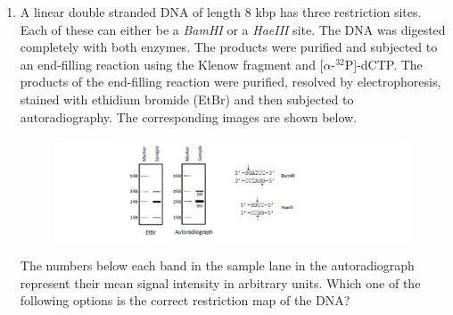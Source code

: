 \documentclass[journal,12pt,onecolumn]{IEEEtran}
\begin{document}
\begin{enumerate}[label=\textbf{Q.\arabic*}]
\begin{multicols}{4}
\begin{enumerate}
\item$0.85$  
\item $0.65$
\item $0.45$  
\item $0.25$  
\end{enumerate}
\end{multicols}\hfill (GATE BT 2015)


\item A linear double stranded DNA of length 8 kbp has three restriction sites. Each of these can either be a \textit{BamHI} or a \textit{HaeIII} site. The DNA was digested completely with both enzymes. The products were purified and subjected to an end-filling reaction using the Klenow fragment and [$\alpha$-$^{32}$P]-dCTP. The products of the end-filling reaction were purified, resolved by electrophoresis, stained with ethidium bromide (EtBr) and then subjected to autoradiography. The corresponding images are shown below.

\begin{figure}[H]
    \centering
    \includegraphics[width=0.7\columnwidth]{fig 8.png}
    \caption{}
    \label{fig:Q65}
\end{figure}

The numbers below each band in the sample lane in the autoradiograph represent their mean signal intensity in arbitrary units. Which one of the following options is the correct restriction map of the DNA?


\end{enumerate}
\end{document}
